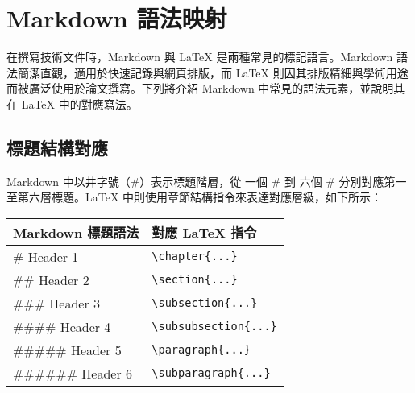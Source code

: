 \chapter{Markdown 語法映射}
\label{chap2}

在撰寫技術文件時，Markdown 與 LaTeX 是兩種常見的標記語言。Markdown 語法簡潔直觀，適用於快速記錄與網頁排版，而 LaTeX 則因其排版精細與學術用途而被廣泛使用於論文撰寫。下列將介紹 Markdown 中常見的語法元素，並說明其在 LaTeX 中的對應寫法。

\section{標題結構對應}

Markdown 中以井字號（\#）表示標題階層，從 一個 \# 到 六個 \# 分別對應第一至第六層標題。LaTeX 中則使用章節結構指令來表達對應層級，如下所示：

\begin{center}
\begin{tabular}{ll}
\toprule
\textbf{Markdown 標題語法} & \textbf{對應 LaTeX 指令} \\
\midrule
\# Header 1        & \verb|\chapter{...}|         \\
\#\# Header 2      & \verb|\section{...}|         \\
\#\#\# Header 3    & \verb|\subsection{...}|      \\
\#\#\#\# Header 4  & \verb|\subsubsection{...}|   \\
\#\#\#\#\# Header 5& \verb|\paragraph{...}|       \\
\#\#\#\#\#\# Header 6 & \verb|\subparagraph{...}| \\
\bottomrule
\end{tabular}
\end{center}

